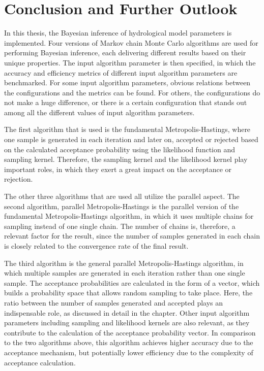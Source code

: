 \chapter{Conclusion and Further Outlook} 
In this thesis, the Bayesian inference of hydrological model parameters is implemented. Four versions of Markov chain Monte Carlo algorithms are used for performing Bayesian inference, each delivering different results based on their unique properties. The input algorithm parameter is then specified, in which the accuracy and efficiency metrics of different input algorithm parameters are benchmarked. For some input algorithm parameters, obvious relations between the configurations and the metrics can be found. For others, the configurations do not make a huge difference, or there is a certain configuration that stands out among all the different values of input algorithm parameters.

The first algorithm that is used is the fundamental Metropolis-Hastings, where one sample is generated in each iteration and later on, accepted or rejected based on the calculated acceptance probability using the likelihood function and sampling kernel. Therefore, the sampling kernel and the likelihood kernel play important roles, in which they exert a great impact on the acceptance or rejection.

The other three algorithms that are used all utilize the parallel aspect. The second algorithm, parallel Metropolis-Hastings is the parallel version of the fundamental Metropolis-Hastings algorithm, in which it uses multiple chains for sampling instead of one single chain. The number of chains is, therefore, a relevant factor for the result, since the number of samples generated in each chain is closely related to the convergence rate of the final result.

The third algorithm is the general parallel Metropolis-Hastings algorithm, in which multiple samples are generated in each iteration rather than one single sample. The acceptance probabilities are calculated in the form of a vector, which builds a probability space that allows random sampling to take place. Here, the ratio between the number of samples generated and accepted plays an indispensable role, as discussed in detail in the chapter. Other input algorithm parameters including sampling and likelihood kernels are also relevant, as they contribute to the calculation of the acceptance probability vector. In comparison to the two algorithms above, this algorithm achieves higher accuracy due to the acceptance mechanism, but potentially lower efficiency due to the complexity of acceptance calculation.

